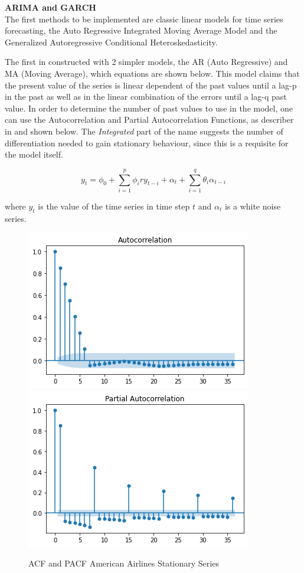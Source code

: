 \documentclass[10pt,twocolumn,letterpaper]{article}
\begin{document}
\textbf{ARIMA and GARCH} \\

The first methods to be implemented are classic linear models for time series forecasting, the Auto Regressive Integrated Moving Average Model and the Generalized Autoregressive Conditional Heteroskedasticity.

The first in constructed with 2 simpler models, the AR (Auto Regressive) and MA (Moving Average), which equations are shown below. This model claims that the present value of the series is linear dependent of the past values until a lag-p in the past as well as in the linear combination of the errors until a lag-q past value. In order to determine the number of past values to use in the model, one can use the Autocorrelation and Partial Autocorrelation Functions, as describer in \cite{tsay2005analysis} and shown below. The \textit{Integrated} part of the name suggests the number of differentiation needed to gain stationary behaviour, since this is a requisite for the model itself.

\begin{equation}
	y_t=\phi_0+\sum_{i=1}^{p}\phi_iry_{t-i}+\alpha_t+\sum_{i=1}^{q}\theta_i\alpha_{t-i}
\end{equation} 

where $y_t$ is the value of the time series in time step $t$ and $\alpha_t$ is a white noise series.

\begin{figure}[h]
	\centering
	\includegraphics[width=0.45\linewidth]{../img/SeriesAnalysis/ACF_AmericanDiff}
	\includegraphics[width=0.45\linewidth]{../img/SeriesAnalysis/PACF_AmericanDiff}
	\caption{ACF and PACF American Airlines Stationary Series}
	\label{fig:acfamericandiff}
\end{figure}
\end{document}
